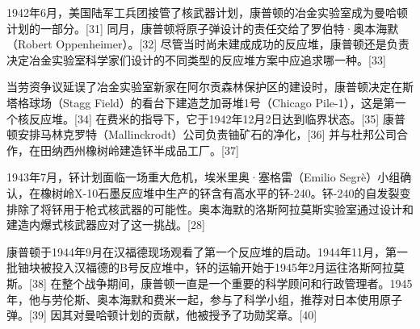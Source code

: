 1942年6月，美国陆军工兵团接管了核武器计划，康普顿的冶金实验室成为曼哈顿计划的一部分。[31] 同月，康普顿将原子弹设计的责任交给了罗伯特·奥本海默（Robert Oppenheimer）。[32] 尽管当时尚未建成成功的反应堆，康普顿还是负责决定冶金实验室科学家们设计的不同类型的反应堆方案中应追求哪一种。[33]

当劳资争议延误了冶金实验室新家在阿尔贡森林保护区的建设时，康普顿决定在斯塔格球场（Stagg Field）的看台下建造芝加哥堆1号（Chicago Pile-1），这是第一个核反应堆。[34] 在费米的指导下，它于1942年12月2日达到临界状态。[35] 康普顿安排马林克罗特（Mallinckrodt）公司负责铀矿石的净化，[36] 并与杜邦公司合作，在田纳西州橡树岭建造钚半成品工厂。[37]

1943年7月，钚计划面临一场重大危机，埃米里奥·塞格雷（Emilio Segrè）小组确认，在橡树岭X-10石墨反应堆中生产的钚含有高水平的钚-240。钚-240的自发裂变排除了将钚用于枪式核武器的可能性。奥本海默的洛斯阿拉莫斯实验室通过设计和建造内爆式核武器应对了这一挑战。[28]

康普顿于1944年9月在汉福德现场观看了第一个反应堆的启动。1944年11月，第一批铀块被投入汉福德的B号反应堆中，钚的运输开始于1945年2月运往洛斯阿拉莫斯。[38] 在整个战争期间，康普顿一直是一个重要的科学顾问和行政管理者。1945年，他与劳伦斯、奥本海默和费米一起，参与了科学小组，推荐对日本使用原子弹。[39] 因其对曼哈顿计划的贡献，他被授予了功勋奖章。[40]